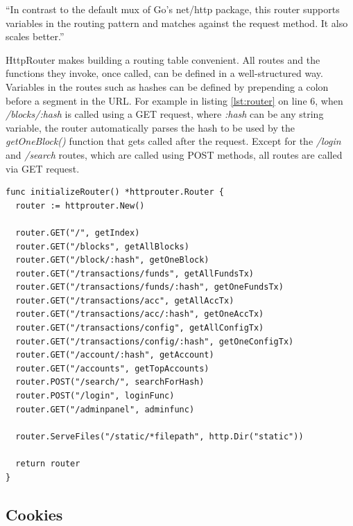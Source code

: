 ``In contrast to the default mux of Go's net/http package, this router supports variables in the routing pattern and matches against the request method. It also scales better.'' \cite{httprouter}

HttpRouter makes building a routing table convenient. All routes and the functions they invoke, once called, can be defined in a well-structured way. Variables in the routes such as hashes can be defined by prepending a colon before a segment in the URL. For example in listing \ref{lst:router} on line 6, when \emph{/blocks/:hash} is called using a GET request, where \emph{:hash} can be any string variable, the router automatically parses the hash to be used by the \emph{getOneBlock()} function that gets called after the request. Except for the \emph{/login} and \emph{/search} routes, which are called using POST methods, all routes are called via GET request.

\begin{lstlisting}[caption={Initialization of the Router},captionpos=b,label={lst:router}]
func initializeRouter() *httprouter.Router {
  router := httprouter.New()

  router.GET("/", getIndex)
  router.GET("/blocks", getAllBlocks)
  router.GET("/block/:hash", getOneBlock)
  router.GET("/transactions/funds", getAllFundsTx)
  router.GET("/transactions/funds/:hash", getOneFundsTx)
  router.GET("/transactions/acc", getAllAccTx)
  router.GET("/transactions/acc/:hash", getOneAccTx)
  router.GET("/transactions/config", getAllConfigTx)
  router.GET("/transactions/config/:hash", getOneConfigTx)
  router.GET("/account/:hash", getAccount)
  router.GET("/accounts", getTopAccounts)
  router.POST("/search/", searchForHash)
  router.POST("/login", loginFunc)
  router.GET("/adminpanel", adminfunc)

  router.ServeFiles("/static/*filepath", http.Dir("static"))

  return router
}
\end{lstlisting}

\subsection{Cookies} \label{cookies}

